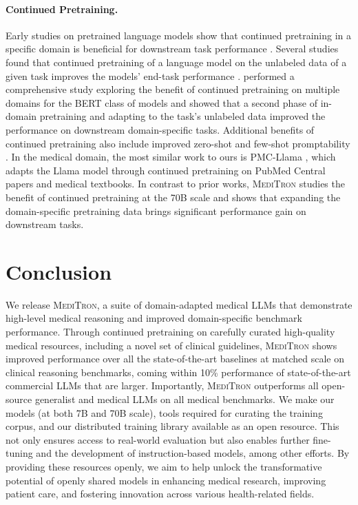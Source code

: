 \documentclass{article}
\newcommand{\llama}{\textnormal{Llama}}
\newcommand{\mtron}{\textsc{MediTron}\xspace}
\begin{document}
\paragraph{Continued Pretraining.}
Early studies on pretrained language models show that continued pretraining in a specific domain is beneficial for downstream task performance \citep{Hoang2019EfficientAO, alsentzer-etal-2019-publicly, chakrabarty-etal-2019-imho, biobert, pubmedbert}. Several studies found that continued pretraining of a language model on the unlabeled data of a given task improves the models' end-task performance \citep{howard-ruder-2018-universal, phang2019sentence, sun2020finetune}. \citet{gururangan-etal-2020-dont} performed a comprehensive study exploring the benefit of continued pretraining on multiple domains for the BERT \citep{Devlin2019BERTPO} class of models and showed that a second phase of in-domain pretraining and adapting to the task’s unlabeled data improved the performance on downstream domain-specific tasks. Additional benefits of continued pretraining also include improved zero-shot and few-shot promptability \citep{wu2022continued}. In the medical domain, the most similar work to ours is PMC-\llama{} \citep{wu2023pmcllama}, which adapts the \llama{} model through continued pretraining on PubMed Central papers and medical textbooks. In contrast to prior works, \mtron{} studies the benefit of continued pretraining at the 70B scale and shows that expanding the domain-specific pretraining data brings significant performance gain on downstream tasks.









 \section{Conclusion}

We release \mtron, a suite of domain-adapted medical LLMs that demonstrate high-level medical reasoning and improved domain-specific benchmark performance. Through continued pretraining on carefully curated high-quality medical resources, including a novel set of clinical guidelines, \mtron{} shows improved performance over all the state-of-the-art baselines at matched scale on clinical reasoning benchmarks, coming within 10\% performance of state-of-the-art commercial LLMs that are  larger. Importantly, \mtron outperforms all open-source generalist and medical LLMs on all medical benchmarks. We make our models (at both 7B and 70B scale), tools required for curating the training corpus, and our distributed training library available as an open resource. This not only ensures access to real-world evaluation but also enables further fine-tuning and the development of instruction-based models, among other efforts. By providing these resources openly, we aim to help unlock the transformative potential of openly shared models in enhancing medical research, improving patient care, and fostering innovation across various health-related fields.
\end{document}
